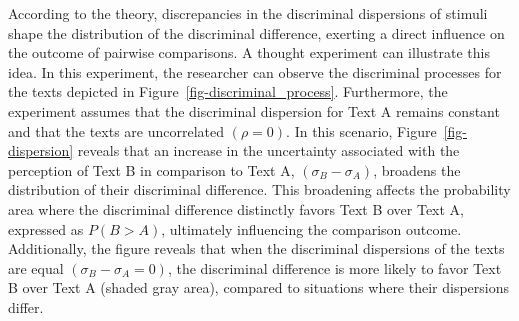 \documentclass[
  authoryear,
  review,
  1p]{elsarticle}
\begin{document}
According to the theory, discrepancies in the discriminal dispersions of
stimuli shape the distribution of the discriminal difference, exerting a
direct influence on the outcome of pairwise comparisons. A thought
experiment can illustrate this idea. In this experiment, the researcher
can observe the discriminal processes for the texts depicted in
Figure~\ref{fig-discriminal_process}. Furthermore, the experiment
assumes that the discriminal dispersion for Text A remains constant and
that the texts are uncorrelated \((\rho=0)\). In this scenario,
Figure~\ref{fig-dispersion} reveals that an increase in the uncertainty
associated with the perception of Text B in comparison to Text A,
\((\sigma_{B}-\sigma_{A})\), broadens the distribution of their
discriminal difference. This broadening affects the probability area
where the discriminal difference distinctly favors Text B over Text A,
expressed as \(P(B > A)\), ultimately influencing the comparison
outcome. Additionally, the figure reveals that when the discriminal
dispersions of the texts are equal \((\sigma_{B}-\sigma_{A}=0)\), the
discriminal difference is more likely to favor Text B over Text A
(shaded gray area), compared to situations where their dispersions
differ.
\end{document}
